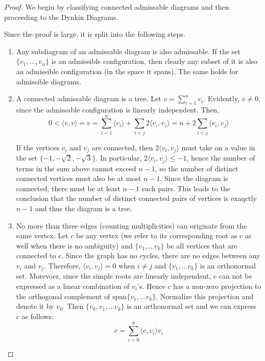 \begin{proof}
    We begin by classifying connected admissable diagrams and then proceeding to the Dynkin Diagrams. \newline
    
    Since the proof is large, it is split into the following steps.
    \begin{enumerate}
        \item Any subdiagram of an admissable diagram is also admissable. If the set 
        $\{v_1, \dots, v_n \}$ is an admissible configuration, then clearly any subset of it is also an admissible configuration
        (in the space it spans). The same holds for admissible diagrams.
        
        \item A connected admissable diagram is a tree. Let $v = \sum_{i=1}^{n} v_i$. Evidently, $v \not= 0$, since the admissable
        configuration is linearly independent. Then,
            \begin{equation*}
                0 < \langle v, v \rangle = v = \sum_{i=1}^{n} \langle v_i \rangle + \sum_{i < j} 2 \langle v_i, v_j \rangle = n + 2 \sum_{i < j} \langle v_i, v_j \rangle 
            \end{equation*}
            
        If the vertices $v_i$ and $v_j$ are connected, then $2 \langle v_i, v_j \rangle$ must take on a value in the set
        $\{-1, -\sqrt{2}, -\sqrt{3}\}$. In particular,  $2 \langle v_i, v_j \rangle \leq - 1$, hence the number of terms in the sum above
        cannot exceed $n-1$, so the number of distinct connected vertices must also be at most $n-1$. Since the diagram is connected,
        there must be at least $n-1$ such pairs. This leads to the conclusion that the number of distinct connected pairs of vertices
        is exaqctly $n-1$ and thus the diagram is a tree.
        
        \item No more than three edges (counting multiplicities) can originate from the same vertex.
        Let $c$ be any vertex (we refer to its corresponding root as $c$ as well when there is no ambiguity)
        and $\{v_1, \dots v_k \}$ be all vertices that are connected to $c$.
        Since the graph has no cycles, there are no edges between any $v_i$ and $v_j$.
        Therefore, $\langle v_i, v_j \rangle = 0$ when $i \not= j$ and $\{v_1, \dots v_k \}$ is an orthonormal set.
        Morevoer, since the simple roots are linearly independent, $c$ can not be expressed as a linear combination of $v_i$'s.
        Hence $c$ has a non-zero projection to the orthogonal complement of $\text{span}\{v_1, \dots v_k\}$.
        Normalize this projection and denote it by $v_0$.
        Then $\{v_0, v_1, \dots v_k \}$ is an orthonormal set and we can express $c$ as follows:
            \begin{equation*}
                c = \sum_{i=0}^k \langle c, v_i \rangle v_i
            \end{equation*}


\end{enumerate}
\end{proof}
